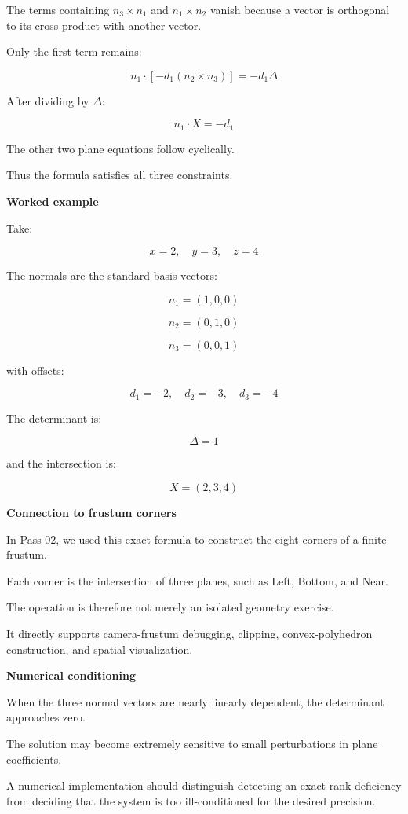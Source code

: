 The terms containing \(n_3\times n_1\) and \(n_1\times n_2\) vanish because a vector is orthogonal to its cross product with another vector.

Only the first term remains:

\[
n_1\cdot[-d_1(n_2\times n_3)] =-d_1\Delta
\]

After dividing by \(\Delta\):

\[
n_1\cdot X=-d_1
\]

The other two plane equations follow cyclically.

Thus the formula satisfies all three constraints.

\textbf{Worked example}

Take:

\[
x=2,\quad y=3,\quad z=4
\]

The normals are the standard basis vectors:

\[
n_1=(1,0,0)
\]

\[
n_2=(0,1,0)
\]

\[
n_3=(0,0,1)
\]

with offsets:

\[
d_1=-2,\quad d_2=-3,\quad d_3=-4
\]

The determinant is:

\[
\Delta=1
\]

and the intersection is:

\[
\boxed{X=(2,3,4)}
\]

\textbf{Connection to frustum corners}

In Pass 02, we used this exact formula to construct the eight corners of a finite frustum.

Each corner is the intersection of three planes, such as Left, Bottom, and Near.

The operation is therefore not merely an isolated geometry exercise.

It directly supports camera-frustum debugging, clipping, convex-polyhedron construction, and spatial visualization.

\textbf{Numerical conditioning}

When the three normal vectors are nearly linearly dependent, the determinant approaches zero.

The solution may become extremely sensitive to small perturbations in plane coefficients.

A numerical implementation should distinguish detecting an exact rank deficiency from deciding that the system is too ill-conditioned for the desired precision.

